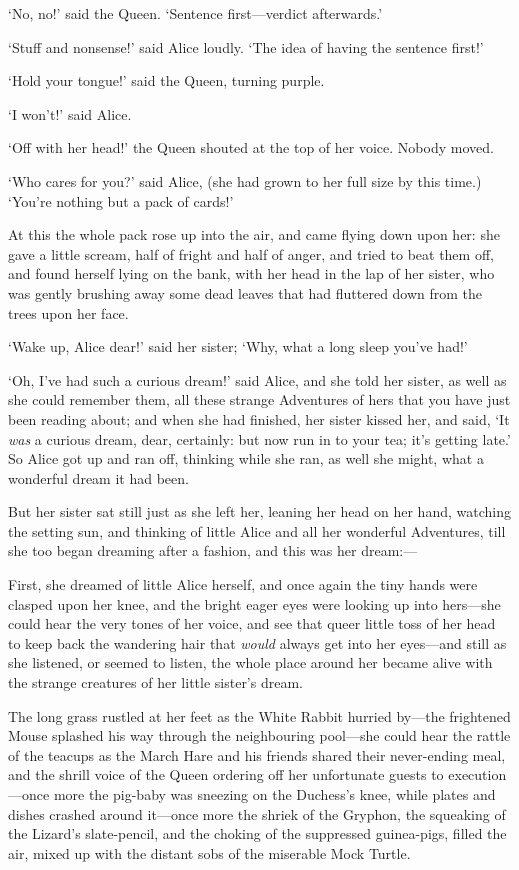\documentclass[12pt,openany]{memoir}
\begin{document}
`No, no!' said the Queen. `Sentence first---verdict afterwards.'

`Stuff and nonsense!' said Alice loudly. `The idea of having the sentence first!'

`Hold your tongue!' said the Queen, turning purple.

`I won't!' said Alice.

`Off with her head!' the Queen shouted at the top of her voice. Nobody moved.

`Who cares for you?' said Alice, (she had grown to her full size by this time.) `You're nothing but a pack of cards!'

At this the whole pack rose up into the air, and came flying down upon her: she gave a little scream, half of fright and half of anger, and tried to beat them off, and found herself lying on the bank, with her head in the lap of her sister, who was gently brushing away some dead leaves that had fluttered down from the trees upon her face.

`Wake up, Alice dear!' said her sister; `Why, what a long sleep you've had!'

`Oh, I've had such a curious dream!' said Alice, and she told her sister, as well as she could remember them, all these strange Adventures of hers that you have just been reading about; and when she had finished, her sister kissed her, and said, `It \textit{was} a curious dream, dear, certainly: but now run in to your tea; it's getting late.' So Alice got up and ran off, thinking while she ran, as well she might, what a wonderful dream it had been.

But her sister sat still just as she left her, leaning her head on her hand, watching the setting sun, and thinking of little Alice and all her wonderful Adventures, till she too began dreaming after a fashion, and this was her dream:---

First, she dreamed of little Alice herself, and once again the tiny hands were clasped upon her knee, and the bright eager eyes were looking up into hers---she could hear the very tones of her voice, and see that queer little toss of her head to keep back the wandering hair that \textit{would} always get into her eyes---and still as she listened, or seemed to listen, the whole place around her became alive with the strange creatures of her little sister's dream.

The long grass rustled at her feet as the White Rabbit hurried by---the frightened Mouse splashed his way through the neighbouring pool---she could hear the rattle of the teacups as the March Hare and his friends shared their never-ending meal, and the shrill voice of the Queen ordering off her unfortunate guests to execution---once more the pig-baby was sneezing on the Duchess's knee, while plates and dishes crashed around it---once more the shriek of the Gryphon, the squeaking of the Lizard's slate-pencil, and the choking of the suppressed guinea-pigs, filled the air, mixed up with the distant sobs of the miserable Mock Turtle.
\end{document}
